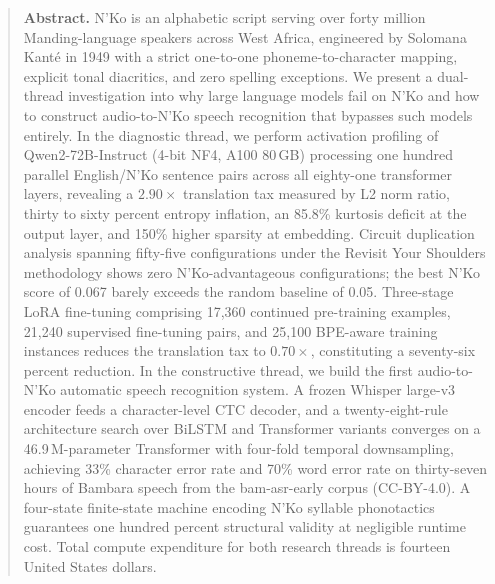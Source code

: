 \documentclass[11pt]{article}
\newcommand{\nko}{N'Ko}
\begin{document}
\begin{quote}
\noindent\textbf{Abstract.}\quad
\nko{} is an alphabetic script serving over forty million Manding-language speakers across West Africa, engineered by Solomana Kant\'e in 1949 with a strict one-to-one phoneme-to-character mapping, explicit tonal diacritics, and zero spelling exceptions. We present a dual-thread investigation into why large language models fail on \nko{} and how to construct audio-to-\nko{} speech recognition that bypasses such models entirely. In the diagnostic thread, we perform activation profiling of Qwen2-72B-Instruct (4-bit NF4, A100 80\,GB) processing one hundred parallel English/\nko{} sentence pairs across all eighty-one transformer layers, revealing a $2.90\times$ translation tax measured by L2 norm ratio, thirty to sixty percent entropy inflation, an 85.8\% kurtosis deficit at the output layer, and 150\% higher sparsity at embedding. Circuit duplication analysis spanning fifty-five configurations under the Revisit Your Shoulders methodology shows zero \nko{}-advantageous configurations; the best \nko{} score of 0.067 barely exceeds the random baseline of 0.05. Three-stage LoRA fine-tuning comprising 17,360 continued pre-training examples, 21,240 supervised fine-tuning pairs, and 25,100 BPE-aware training instances reduces the translation tax to $0.70\times$, constituting a seventy-six percent reduction. In the constructive thread, we build the first audio-to-\nko{} automatic speech recognition system. A frozen Whisper large-v3 encoder feeds a character-level CTC decoder, and a twenty-eight-rule architecture search over BiLSTM and Transformer variants converges on a 46.9\,M-parameter Transformer with four-fold temporal downsampling, achieving 33\% character error rate and 70\% word error rate on thirty-seven hours of Bambara speech from the bam-asr-early corpus (CC-BY-4.0). A four-state finite-state machine encoding \nko{} syllable phonotactics guarantees one hundred percent structural validity at negligible runtime cost. Total compute expenditure for both research threads is fourteen United States dollars.
\end{quote}

\vspace{1em}

\end{document}

